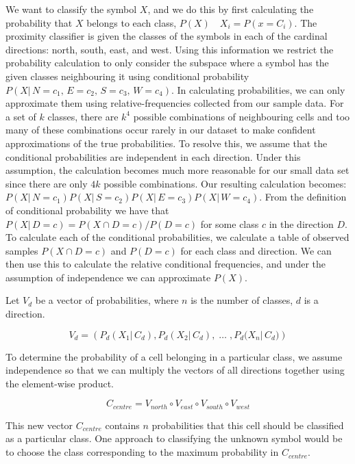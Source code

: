 \documentclass[preprint,5p,times,twocolumn]{elsarticle}
\begin{document}
We want to classify the symbol $X$, and we do this by first calculating the
probability that $X$ belongs to each class, $P(X)\quad X_i = P(x\!=\!C_i)$.
The proximity classifier is given the classes of the symbols in each of the
cardinal directions: north, south, east, and west. Using this information
we restrict the probability calculation to only consider the subspace
where a symbol has the given classes neighbouring it using
conditional probability $P(X|\,N\!=\!c_1,\,E\!=\!c_2,\,S\!=\!c_3,\,W\!=\!c_4)$.
In calculating probabilities, we can only approximate them using relative-frequencies collected
from our sample data. For a set of $k$ classes, there are $k^4$ possible combinations of neighbouring
cells and too many of these combinations occur rarely in our dataset to make
confident approximations of the true probabilities. To resolve this, we assume that
the conditional probabilities are independent in each direction. Under this
assumption, the calculation becomes much more reasonable for our small data set
since there are only $4k$ possible combinations. Our resulting calculation becomes:
$P(X|\,N\!=\!c_1)P(X|\,S\!=\!c_2)P(X|\,E\!=\!c_3)P(X|\,W\!=\!c_4)$. From the
definition of conditional probability we have that $P(X|\,D\!=\!c) = P(X \cap D\!=\!c)/P(D=c)$
for some class $c$ in the direction $D$. To calculate each of the conditional probabilities,
we calculate a table of observed samples $P(X\cap D\!=\!c)$ and $P(D\!=\!c)$ for each class and direction.
We can then use this to calculate the relative conditional frequencies, and under the assumption
of independence we can approximate $P(X)$.


Let $V_{d}$ be a vector of probabilities, where $n$ is the number of classes,
$d$ is a direction.

\begin{equation}
V_{d} = \left(P_{d}{(X_{1} | \, C_{d})}, P_{d}{(X_{2} | \, C_{d}),\; \ldots \; , P_{d}{(X_{n} | \, C_{d}})}\right)
\end{equation}

To determine the probability of a cell belonging in a particular class, we assume independence
so that we can multiply the vectors of all directions together using the element-wise product.

\begin{equation}
C_{centre} = V_{north} \circ V_{east} \circ V_{south} \circ V_{west}
\end{equation}

This new vector $C_{centre}$ contains $n$ probabilities that this cell should be
classified as a particular class. One approach to classifying the unknown symbol
would be to choose the class corresponding to the maximum probability in $C_{centre}$.
\end{document}
